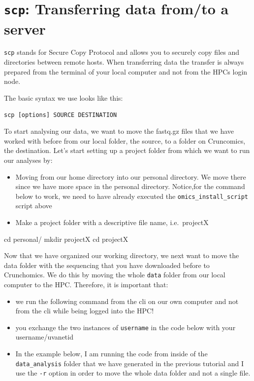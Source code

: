 \documentclass[
  letterpaper,
  DIV=11,
  numbers=noendperiod]{scrreprt}
\newenvironment{Shaded}{}{}
\newcommand{\BuiltInTok}[1]{\textcolor[rgb]{0.84,0.23,0.29}{#1}}
\newcommand{\FunctionTok}[1]{\textcolor[rgb]{0.44,0.26,0.76}{#1}}
\newcommand{\NormalTok}[1]{\textcolor[rgb]{0.14,0.16,0.18}{#1}}
\providecommand{\tightlist}{%
  \setlength{\itemsep}{0pt}\setlength{\parskip}{0pt}}\usepackage{longtable,booktabs,array}
\begin{document}
\section{\texorpdfstring{\texttt{scp}: Transferring data from/to a
server}{scp: Transferring data from/to a server}}\label{scp-transferring-data-fromto-a-server}

\texttt{scp} stands for Secure Copy Protocol and allows you to securely
copy files and directories between remote hosts. When transferring data
the transfer is always prepared from the terminal of your local computer
and not from the HPCs login node.

The basic syntax we use looks like this:

\texttt{scp\ {[}options{]}\ SOURCE\ DESTINATION}

To start analysing our data, we want to move the fastq.gz files that we
have worked with before from our local folder, the source, to a folder
on Cruncomics, the destination. Let's start setting up a project folder
from which we want to run our analyses by:

\begin{itemize}
\tightlist
\item
  Moving from our home directory into our personal directory. We move
  there since we have more space in the personal directory. Notice,for
  the command below to work, we need to have already executed the
  \texttt{omics\_install\_script} script above
\item
  Make a project folder with a descriptive file name, i.e.~projectX
\end{itemize}

\begin{Shaded}
\begin{Highlighting}[]
\BuiltInTok{cd}\NormalTok{ personal/}
\FunctionTok{mkdir}\NormalTok{ projectX}
\BuiltInTok{cd}\NormalTok{ projectX}
\end{Highlighting}
\end{Shaded}

Now that we have organized our working directory, we next want to move
the data folder with the sequencing that you have downloaded before to
Crunchomics. We do this by moving the whole \texttt{data} folder from
our local computer to the HPC. Therefore, it is important that:

\begin{itemize}
\tightlist
\item
  we run the following command from the cli on our own computer and not
  from the cli while being logged into the HPC!
\item
  you exchange the two instances of \texttt{username} in the code below
  with your username/uvanetid
\item
  In the example below, I am running the code from inside of the
  \texttt{data\_analysis} folder that we have generated in the previous
  tutorial and I use the \texttt{-r} option in order to move the whole
  data folder and not a single file.
\end{itemize}
\end{document}
